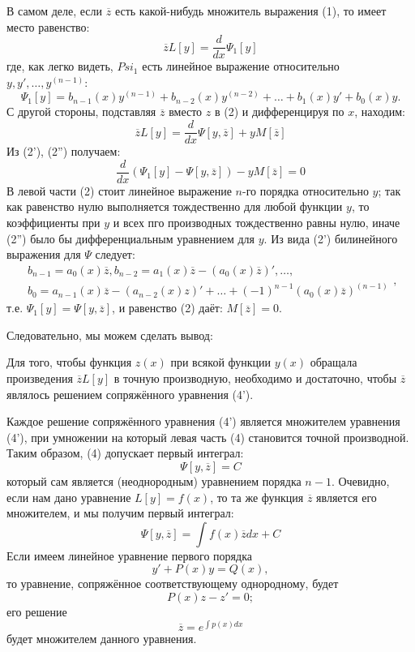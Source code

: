 В самом деле, если $\overline{z}$ есть какой-нибудь множитель выражения (1), то имеет место равенство:
\[
	\overline{z} L[y] = \frac{d}{dx} \Psi_1 [y] \tag{2'}
\]
где, как легко видеть, $Psi_1$ есть линейное выражение относительно $y, y', \dots, y^{(n-1)}$:
\[
	\Psi_1[y] = b_{n-1}(x) y^{(n-1)} + b_{n-2} (x) y^{(n-2)} + \dots + b_1 (x) y' + b_0 (x) y.
\]
С другой стороны, подставляя $\overline{z}$ вместо $z$ в (2) и дифференцируя по $x$, находим:
\[
	\overline{z} L[y] = \frac{d}{dx} \Psi\left[ y, \overline{z}\right] + y M\left[ \overline{z}\right] \tag{2''}
\]
Из (2'), (2'') получаем:
\[
	\frac{d}{dx} \left( \Psi_1[y] - \Psi\left[ y, \overline{z}\right]\right) - yM\left[ \overline{z}\right]= 0 \tag{2\textquotesingle \textquotesingle \textquotesingle}
\]
В левой части (2\textquotesingle \textquotesingle \textquotesingle) стоит линейное выражение $n$-го порядка относительно $y$; так как равенство нулю выполняется тождественно для любой функции $y$, то коэффициенты при $y$ и всех пго производных тождественно равны нулю, иначе (2'') было бы дифференциальным уравнением для $y$. Из вида (2') билинейного выражения для $\Psi$ следует:
\[
	\begin{aligned}
		b_{n-1} = a_0 (x) \overline{z}, b_{n-2} = a_1 (x) \overline{z} - \left(a_0(x) \overline{z} \right)', \dots, \\
		b_0 = a_{n-1} (x) \overline{z} - (a_{n-2} (x) z)' + \dots + (-1)^{n-1} \left( a_0(x) \overline{z}\right)^{(n-1)}
	\end{aligned},
\]
т.е. $\Psi_1[y] = \Psi \left[ y, \overline{z}\right]$, и равенство (2\textquotesingle \textquotesingle \textquotesingle) даёт: $M\left[ \overline{z}\right]=0$.

Следовательно, мы можем сделать вывод:

Для того, чтобы функция $z(x)$ при всякой функции $y(x)$ обращала произведения $\overline{z}L[y]$ в точную производную, необходимо и достаточно, чтобы $\overline{z}$ являлось решением сопряжённого уравнения (4').

Каждое решение сопряжённого уравнения (4') является множителем уравнения (4'), при умножении на который левая часть (4) становится точной производной. Таким образом, (4) допускает первый интеграл:
\[
	\Psi\left[ y, \overline{z}\right] = C \tag{5}
\]
который сам является (неоднородным) уравнением порядка $n-1$. Очевидно, если нам дано уравнение $L[y]=f(x)$, то та же функция $\overline{z}$ является его множителем, и мы получим первый интеграл:
\[
	\Psi \left[ y, \overline{z}\right] = \int f(x) \overline{z}dx + C
\]
Если имеем линейное уравнение первого порядка
\[
	y'+P(x)y = Q(x),
\]
то уравнение, сопряжённое соответствующему однородному, будет
\[
	P(x)z-z'=0;
\]
его решение
\[
	\overline{z} = e^{\int p(x)dx}	
\]
будет множителем данного уравнения.

